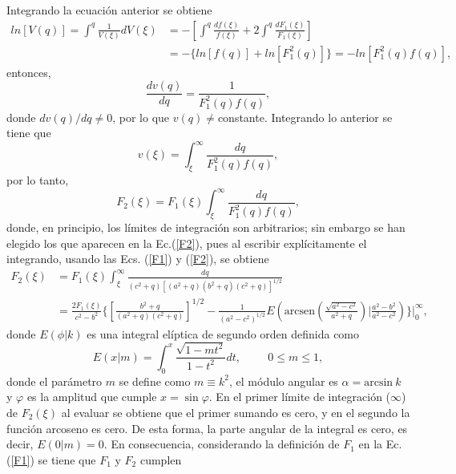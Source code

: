 Integrando la ecuación anterior se obtiene
\begin{align}
    ln[V(q)]=\int^{q}\frac{1}{V(\xi)}dV(\xi)&=-\left[\int^q \frac{df(\xi)}{f(\xi)}+2\int^q \frac{dF_1(\xi)}{F_1(\xi)}\right]\nonumber\\
    &=-\{ln[f(q)]+ln[F_1^2(q)]\}=-ln[F_1^2(q)f(q)],
\end{align}
entonces,
\begin{equation}
    \frac{dv(q)}{dq}=\frac{1}{F_1^2(q)f(q)},
\end{equation}
donde $dv(q)/dq\neq 0$, por lo que $v(q)\neq $constante. Integrando lo anterior se tiene que
\begin{equation}
    v(\xi)=\int_{\xi}^{\infty}\frac{dq}{F_1^2(q)f(q)},
\end{equation}
por lo tanto, 
\begin{equation}
  F_2(\xi)=F_1(\xi)\int_{\xi}^{\infty}\frac{dq}{F_1^2(q)f(q)},
  \label{F2}
\end{equation}
donde, en principio, los límites de integración son arbitrarios; sin embargo se han elegido los que aparecen
en la Ec.(\ref{F2}), pues al escribir explícitamente el integrando, usando las Ecs. (\ref{F1}) y (\ref{F2}), se obtiene
\begin{align}
    F_2(\xi)&=F_1(\xi)\int_{\xi}^{\infty}\frac{dq}{(c^2+q)[(a^2+q)(b^2+q)(c^2+q)]^{1/2}}\nonumber\\
    &=\frac{2F_1(\xi)}{c^2-b^2}\Bigg\{\left[\frac{b^2+q}{(a^2+q)(c^2+q)}\right]^{1/2}-\frac{1}{(a^2-c^2)^{1/2}}E\left(\mbox{arcsen}\left(\frac{\sqrt{a^2-c^2}}{a^2+q}\right)\Bigg|\frac{a^2-b^2}{a^2-c^2}\right)\Bigg\}\Bigg|_0^{\infty},
\end{align}
donde $E(\phi|k)$ es una integral elíptica de segundo orden definida como \cite{Abramo}
\begin{equation}
    E(x|m)=\int_{0}^x\frac{\sqrt{1-mt^2}}{1-t^2}dt,\hspace{1cm}0\leq m\leq 1,
\end{equation}
donde el parámetro $m$ se define como $m\equiv k^2$, el módulo angular es $\alpha=\mbox{arcsin}\:k$ y $\varphi$ es la amplitud que cumple $x=\sin\varphi$. En el primer límite de integración ($\infty$) de $F_2(\xi)$ al evaluar se obtiene que el primer sumando es cero, y en el segundo la función arcoseno es cero. De esta forma, la parte angular de la integral es cero, es decir, $E(0|m)=0$. En consecuencia, considerando la definición de $F_1$ en la Ec.(\ref{F1}) se tiene que $F_1$ y $F_2$ cumplen

